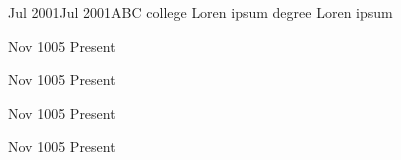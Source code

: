 \usepackage{blindtext}  
\usepackage{lipsum}

\def\lrand{\lipsum[-]}
\def\firstname{Loren}
\def\lastname{Ipsum}
\def\email{loren.ipsum@gmail.com}
\def\linkedin{linkedin.com/in/lorenipsum}
\def\github{github.com/lorenipsum}
\def\phone{+1 (911) 113-9126}

\def\jDescribeBegin{\begin{description}}
\def\jDescribeEnd{\end{description}}

\def\profileSummary{
\section{Career summary so far}
\blindtext
}

\def\skills{
\jDescribeBegin
    \item[Technical] List computer software and programming languages 
    \item[Language] List foreign languages and your level of fluency
    \item[Laboratory] List scientific / research lab techniques or tools [If Applicable]
    \item[Interests] List activities you enjoy that may spark interview conversation
\jDescribeEnd

}

\def\achievements{
    \jbegin
        \jitem {\lrand[1]}
        \jitem {\lrand[2]}
        \jitem {\lrand[1]}
        \jitem {\lrand[2]}
    \jend
}

{Jul 2001}{Jul 2001}{ABC college }
{Loren ipsum degree}
{Loren ipsum}

{Nov 1005}
{Present}
{\lrand[1]}
{\lrand[1]}
{\lrand[1]}
{
\jbegin
    \jitem{\lrand[2]}
    \jitem{\lrand[1]}
    \jitem{\lrand[3]}
    \jitem{\lrand[5]}
\jend
}


{Nov 1005}
{Present}
{\lrand[1]}
{\lrand[1]}
{\lrand[1]}
{
\jbegin
    \jitem{\lrand[2]}
    \jitem{\lrand[1]}
    \jitem{\lrand[7]}
\jend
}


{Nov 1005}
{Present}
{\lrand[1]}
{\lrand[1]}
{\lrand[1]}
{
\jbegin
    \jitem{\lrand[2]}
    \jitem{\lrand[1]}
    \jitem{\lrand[7]}
\jend
}

{Nov 1005}
{Present}
{\lrand[1]}
{\lrand[1]}
{\lrand[1]}
{
\jbegin
    \jitem{\lrand[2]}
    \jitem{\lrand[1]}
    \jitem{\lrand[7]}
\jend
}

